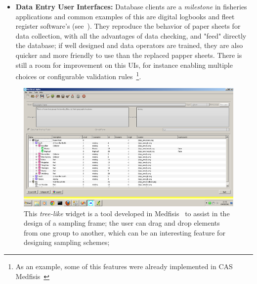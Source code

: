 \documentclass[11pt]{article} %
\begin{document}
\begin{itemize}
  \item \textbf{Data Entry User Interfaces:} Database clients are a \textit{milestone} in fisheries applications and common examples of this are digital logbooks and fleet register software's (see~\cite{medfisis}). They reproduce the behavior of paper sheets for data collection, with all the advantages of data checking, and "feed" directly the database; if well designed and data operators are trained, they are also quicker and more friendly to use than the replaced papper sheets. There is still a room for improvement on this UIs, for instance enabling multiple choices or configurable validation rules~\footnote{As an example, some of this features were already implemented in CAS Medfisis~\cite{medfisis}}.
\end{itemize}

  \begin{figure}[!ht]%
    \begin{center} 
	\includegraphics[width=\textwidth ]{geographic_frame}
      \caption[This \textit{tree-like} widget is a tool developed in Medfisis~\ref{medfisis} to assist in the design of a sampling frame; the user can drag and drop elements from one group to another, which can be an interesting feature for designing sampling schemes;] {This \textit{tree-like} widget is a tool developed in Medfisis~\cite{medfisis} to assist in the design of a sampling frame; the user can drag and drop elements from one group to another, which can be an interesting feature for designing sampling schemes;}
    \end{center} 
  \end{figure}
\end{document}
